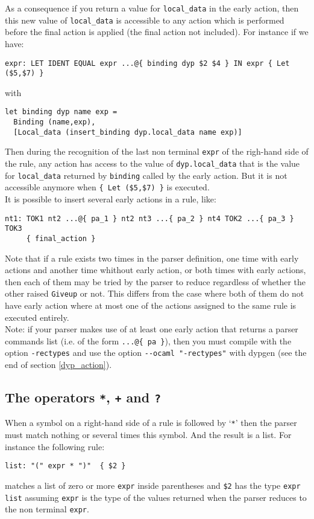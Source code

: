 \documentclass[12pt]{article}
\begin{document}
{As a consequence if you return a value for \verb|local_data| in the early action, then this new value of \verb|local_data| is accessible to any action which is performed before the final action is applied (the final action not included). For instance if we have:
\begin{verbatim}
expr: LET IDENT EQUAL expr ...@{ binding dyp $2 $4 } IN expr { Let ($5,$7) }
\end{verbatim}
with
\begin{verbatim}
let binding dyp name exp =
  Binding (name,exp),
  [Local_data (insert_binding dyp.local_data name exp)]
\end{verbatim}
Then during the recognition of the last non terminal \verb|expr| of the righ-hand side of the rule, any action has access to the value of \verb|dyp.local_data| that is the value for \verb|local_data| returned by \texttt{binding} called by the early action. But it is not accessible anymore when \verb|{ Let ($5,$7) }| is executed.\\

It is possible to insert several early actions in a rule, like:
\begin{verbatim}
nt1: TOK1 nt2 ...@{ pa_1 } nt2 nt3 ...{ pa_2 } nt4 TOK2 ...{ pa_3 } TOK3
     { final_action }
\end{verbatim}

Note that if a rule exists two times in the parser definition, one time with early actions and another time whithout early action, or both times with early actions, then each of them may be tried by the parser to reduce regardless of whether the other raised \texttt{Giveup} or not. This differs from the case where both of them do not have early action where at most one of the actions assigned to the same rule is executed entirely.\\

Note: if your parser makes use of at least one early action that returns a parser commands list (i.e. of the form \verb|...@{ pa }|), then you must compile with the option \verb|-rectypes| and use the option \verb|--ocaml "-rectypes"| with dypgen (see the end of section \ref{dyp_action}).

\subsection{The operators \texttt{*}, \texttt{+} and \texttt{?}}

When a symbol on a right-hand side of a rule is followed by `\verb|*|' then the parser must match nothing or several times this symbol. And the result is a list. For instance the following rule:
\begin{verbatim}
list: "(" expr * ")"  { $2 }
\end{verbatim}
matches a list of zero or more \verb|expr| inside parentheses and \verb|$2| has the type \verb|expr list| assuming \verb|expr| is the type of the values returned when the parser reduces to the non terminal \verb|expr|.\\

}
\end{document}
